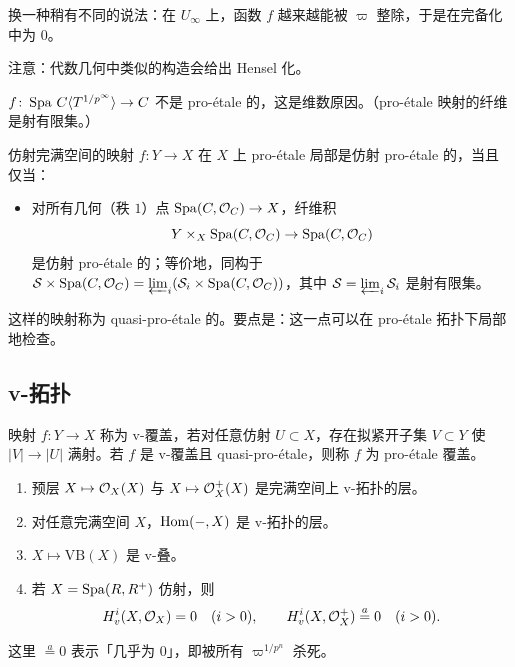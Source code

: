 换一种稍有不同的说法：在 $U_\infty$ 上，函数 $f$ 越来越能被 $\varpi$ 整除，于是在完备化中为 $0$。

注意：代数几何中类似的构造会给出 Hensel 化。

\begin{example}
$f\colon\operatorname{Spa}\,C\langle T^{1/p^\infty}\rangle\to C$ 不是 pro-étale 的，这是维数原因。（pro-étale 映射的纤维是射有限集。）
\end{example}

\begin{theorem}
仿射完满空间的映射 $f\colon Y\to X$ 在 $X$ 上 pro-étale 局部是仿射 pro-étale 的，当且仅当：
\begin{itemize}
\item 对所有几何（秩 $1$）点 $\operatorname{Spa}(C,\mathcal{O}_C)\to X$，纤维积
\[
Y\times_X\operatorname{Spa}(C,\mathcal{O}_C)\to\operatorname{Spa}(C,\mathcal{O}_C)
\]
是仿射 pro-étale 的；等价地，同构于 $\mathcal S\times\operatorname{Spa}(C,\mathcal{O}_C)=\varprojlim_i(\mathcal S_i\times\operatorname{Spa}(C,\mathcal{O}_C))$，其中 $\mathcal S=\varprojlim_i\mathcal S_i$ 是射有限集。
\end{itemize}
\end{theorem}

\begin{definition}
这样的映射称为 quasi-pro-étale 的。要点是：这一点可以在 pro-étale 拓扑下局部地检查。
\end{definition}

\subsection{v-拓扑}

\begin{definition}
映射 $f\colon Y\to X$ 称为 v-覆盖，若对任意仿射 $U\subset X$，存在拟紧开子集 $V\subset Y$ 使 $|V|\to|U|$ 满射。若 $f$ 是 v-覆盖且 quasi-pro-étale，则称 $f$ 为 pro-étale 覆盖。
\end{definition}

\begin{theorem}
\begin{enumerate}[label=(\arabic*)]
\item 预层 $X\mapsto\mathcal{O}_X(X)$ 与 $X\mapsto\mathcal{O}_X^+(X)$ 是完满空间上 v-拓扑的层。
\item 对任意完满空间 $X$，$\operatorname{Hom}(-,X)$ 是 v-拓扑的层。
\item $X\mapsto\mathrm{VB}(X)$ 是 v-叠。
\item 若 $X=\operatorname{Spa}(R,R^+)$ 仿射，则
\[
H^i_v(X,\mathcal{O}_X)=0\quad(i>0),\qquad H^i_v(X,\mathcal{O}_X^+)\overset{a}{=}0\quad(i>0).
\]
\end{enumerate}
这里 $\overset{a}{=}0$ 表示「几乎为 $0$」，即被所有 $\varpi^{1/p^n}$ 杀死。
\end{theorem}

